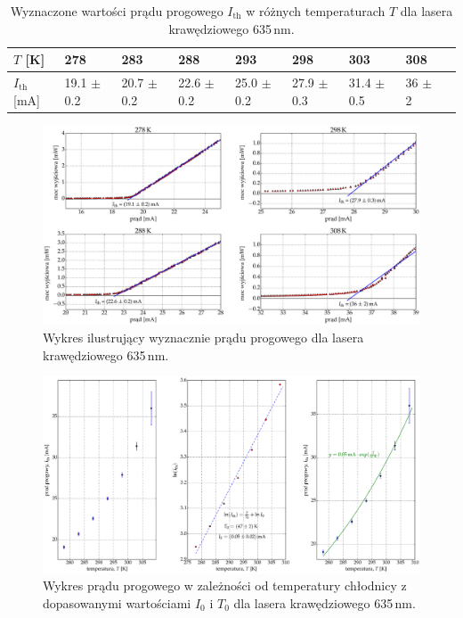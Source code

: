 \begin{table}[H]
\begin{center}
\caption{Wyznaczone wartości prądu progowego $I_{\mathrm{th}}$ w różnych temperaturach $T$ dla lasera krawędziowego 635\,nm. }
\begin{tabular}{ | C{1.5cm}|  C{1.5cm} | C{1.5cm} | C{1.5cm}| C{1.5cm} | C{1.5cm}| C{1.5cm}| C{2.0cm}| C{2.0cm}|}
\hline
$T$ [K] 	&   278 & 283  	& 288 & 293 & 298 & 303 & 308 \\ \hline
$I_{\mathrm{th}}$ [mA]  &	19.1 $\pm$ 0.2  & 20.7 $\pm$ 0.2 & 22.6 $\pm$ 0.2 &
25.0 $\pm$ 0.2  & 27.9 $\pm$ 0.3 & 31.4 $\pm$ 0.5 & 36 $\pm$ 2	\\ \hline
\end{tabular}
\label{tab:tabela_635}
\end{center}
\end{table}
\begin{figure}[H]
\center
  \includegraphics[scale=0.30]{plot635/plot_i_th_4.eps}
  \caption{Wykres ilustrujący wyznacznie prądu progowego dla lasera krawędziowego 635\,nm.}
  \label{fig:plot_i_th_4}
\end{figure}
\begin{figure}
\center
  \includegraphics[scale=0.30]{plot635/plot_fit.eps}
  \caption{Wykres prądu progowego w zależności od temperatury chłodnicy z dopasowanymi wartościami $I_{0}$ i $T_{0}$ dla lasera krawędziowego 635\,nm.}
  \label{fig:plot_fit}
\end{figure}
